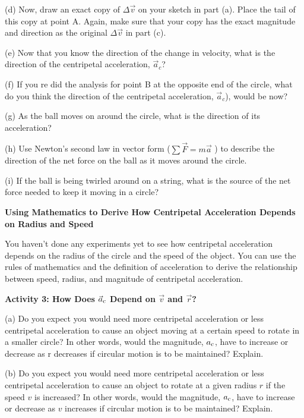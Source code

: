 (d) Now, draw an exact copy of \( \Delta  \vec {v}\) on your sketch in part
(a). Place the tail of this copy at point A. Again, make sure that your copy
has the exact magnitude and direction as the original \( \Delta  \vec {v}\)
in part (c).
\vspace{30mm}

(e) Now that you know the direction of the change in velocity, what is the direction
of the centripetal acceleration, \(\vec{a} _{c} \)?
\vspace{20mm}

(f) If you re did the analysis for point B at the opposite end of the circle,
what do you think the direction of the centripetal acceleration, \(\vec{a} _{c} \)),
would be now?
\vspace{20mm}

(g) As the ball moves on around the circle, what is the direction of its acceleration?
\vspace{20mm}

(h) Use Newton's second law in vector form (\( \sum {\vec F} = m{\vec a}\)
) to describe the direction of the net force on the ball as it moves around
the circle.
\vspace{20mm}

(i) If the ball is being twirled around on a string, what is the source of the
net force needed to keep it moving in a circle?
\answerspace{20mm}

\pagebreak[20]
\textbf{Using Mathematics to Derive How Centripetal Acceleration Depends on
Radius and Speed }

You haven't done any experiments yet to see how centripetal acceleration depends
on the radius of the circle and the speed of the object. You can use the rules
of mathematics and the definition of acceleration to derive the relationship
between speed, radius, and magnitude of centripetal acceleration. 

\textbf{Activity 3: How Does \(\vec a _{\rm c} \) Depend on $\vec v$ and $\vec r$?} 

(a) Do you expect you would need more centripetal acceleration or less centripetal
acceleration to cause an object moving at a certain speed to rotate in a smaller
circle? In other words, would the magnitude, \( a_{\rm c} \), have to increase
or decrease as r decreases if circular motion is to be maintained? Explain.
\vspace{20mm}

(b) Do you expect you would need more centripetal acceleration or less centripetal
acceleration to cause an object to rotate at a given radius $r$ if the speed $v$
is increased? In other words, would the magnitude, \( a_{\rm c} \), have to increase
or decrease as $v$ increases if circular motion is to be maintained? Explain.
\vspace{20mm}

